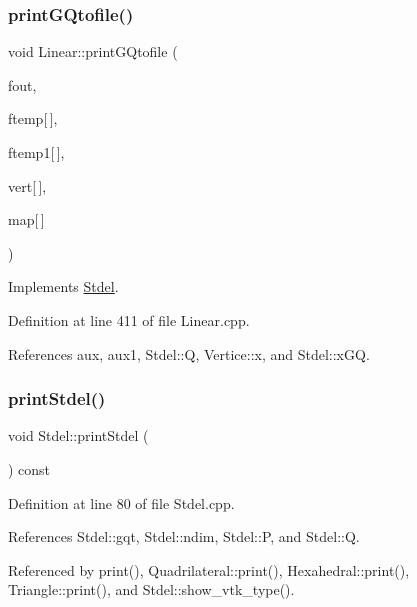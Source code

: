 \subsubsection{\texorpdfstring{print\+G\+Qtofile()}{printGQtofile()}}
{\footnotesize\ttfamily void Linear\+::print\+G\+Qtofile (\begin{DoxyParamCaption}\item[{F\+I\+LE $\ast$}]{fout,  }\item[{const double}]{ftemp\mbox{[}$\,$\mbox{]},  }\item[{const double}]{ftemp1\mbox{[}$\,$\mbox{]},  }\item[{const \hyperlink{structVertice}{Vertice}}]{vert\mbox{[}$\,$\mbox{]},  }\item[{const int}]{map\mbox{[}$\,$\mbox{]} }\end{DoxyParamCaption})\hspace{0.3cm}{\ttfamily [virtual]}}



Implements \hyperlink{classStdel_a8196ddf2ec3c88627e33d19f93fdb354}{Stdel}.



Definition at line 411 of file Linear.\+cpp.



References aux, aux1, Stdel\+::Q, Vertice\+::x, and Stdel\+::x\+GQ.

\mbox{\label{classStdel_a54b5768d09f500cb949e66fc234eac70}} 
\subsubsection{\texorpdfstring{print\+Stdel()}{printStdel()}}
{\footnotesize\ttfamily void Stdel\+::print\+Stdel (\begin{DoxyParamCaption}{ }\end{DoxyParamCaption}) const\hspace{0.3cm}{\ttfamily [inherited]}}



Definition at line 80 of file Stdel.\+cpp.



References Stdel\+::gqt, Stdel\+::ndim, Stdel\+::P, and Stdel\+::Q.



Referenced by print(), Quadrilateral\+::print(), Hexahedral\+::print(), Triangle\+::print(), and Stdel\+::show\+\_\+vtk\+\_\+type().

